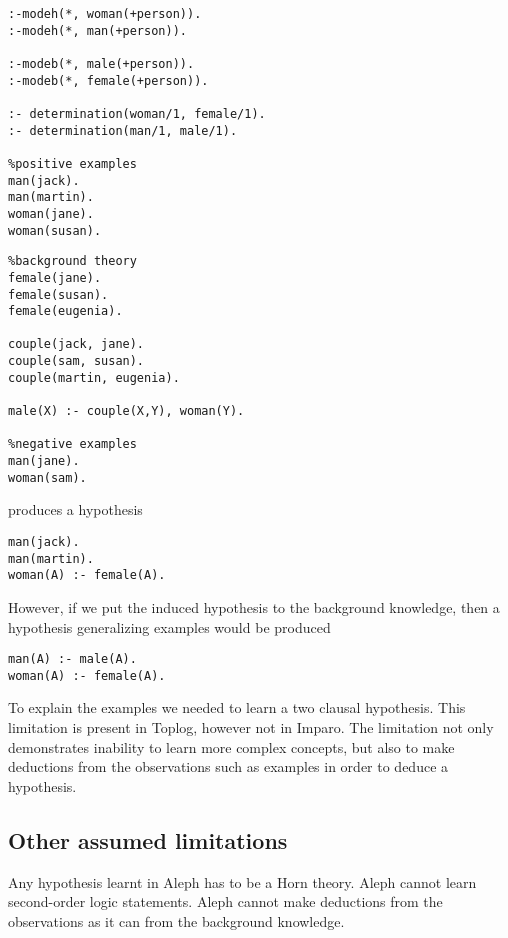 \begin{minipage}[t]{.50\textwidth}
\begin{lstlisting}
:-modeh(*, woman(+person)).
:-modeh(*, man(+person)).

:-modeb(*, male(+person)).
:-modeb(*, female(+person)).

:- determination(woman/1, female/1).
:- determination(man/1, male/1).

%positive examples
man(jack).
man(martin).
woman(jane).
woman(susan).
\end{lstlisting}
\end{minipage}
\begin{minipage}[t]{.20\textwidth}
\begin{lstlisting}
%background theory
female(jane).
female(susan).
female(eugenia).

couple(jack, jane).
couple(sam, susan).
couple(martin, eugenia).

male(X) :- couple(X,Y), woman(Y).

%negative examples
man(jane).
woman(sam).
\end{lstlisting}
\end{minipage}

produces a hypothesis
\begin{lstlisting}
man(jack).
man(martin).
woman(A) :- female(A).
\end{lstlisting}

However, if we put the induced hypothesis to the background knowledge, then a hypothesis generalizing  examples would be produced
\begin{lstlisting}
man(A) :- male(A).
woman(A) :- female(A).
\end{lstlisting}

To explain the  examples we needed to learn a two clausal hypothesis. This limitation is present in Toplog, however not in Imparo. The limitation not only demonstrates inability to learn more complex concepts, but also to make deductions from the observations such as  examples in order to deduce a hypothesis.

\subsection{Other assumed limitations}
Any hypothesis learnt in Aleph has to be a Horn theory. Aleph cannot learn second-order logic statements. Aleph cannot make deductions from the observations as it can from the background knowledge.

